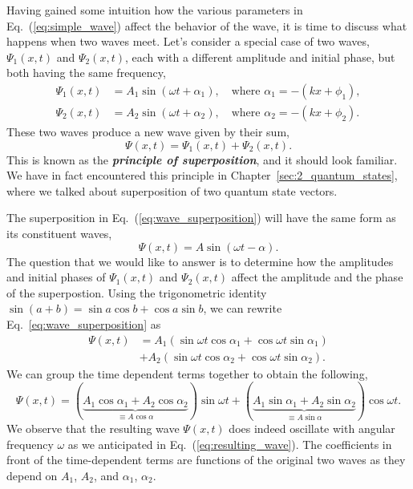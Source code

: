 Having gained some intuition how the various parameters in Eq.~(\ref{eq:simple_wave}) affect the behavior of the wave, it is time to discuss what happens when two waves meet.
Let's consider a special case of two waves, $\Psi_1(x,t)$ and $\Psi_2(x,t)$, each with a different amplitude and initial phase, but both having the same frequency,
\begin{align}
    \Psi_1(x,t) & = A_1 \sin \left(\omega t+\alpha_1\right), \quad\text{where } \alpha_1=-\left(k x+\phi_1\right), \\
    \Psi_2(x,t) & = A_2 \sin \left(\omega t+\alpha_2\right), \quad\text{where } \alpha_2=-\left(k x+\phi_2\right).
    \label{eq:superposition}
\end{align}
These two waves produce a new wave given by their sum,
\begin{equation}
    \Psi(x,t) = \Psi_1(x,t) + \Psi_2(x,t).
    \label{eq:wave_superposition}
\end{equation}
This is known as the \textbf{\emph{principle of superposition}},
and it should look familiar.
We have in fact encountered this principle in Chapter~\ref{sec:2_quantum_states}, where we talked about superposition of two quantum state vectors.

The superposition in Eq.~(\ref{eq:wave_superposition}) will have the same form as its constituent waves,
\begin{equation}
    \Psi(x,t) = A \sin (\omega t-\alpha).
    \label{eq:resulting_wave}
\end{equation}
The question that we would like to answer is to determine how the amplitudes and initial phases of $\Psi_1(x,t)$ and $\Psi_2(x,t)$ affect the amplitude and the phase of the superpostion.
Using the trigonometric identity $\sin (a + b)=\sin a \cos b +\cos a \sin b$, we can rewrite Eq.~\ref{eq:wave_superposition} as
\begin{align}
    \Psi(x,t) & = A_1 \left( \sin\omega t \cos\alpha_1 + \cos\omega t \sin \alpha_1 \right) \nonumber\\
    & + A_2 \left( \sin\omega t \cos\alpha_2 + \cos\omega t \sin\alpha_2 \right).
\end{align}
We can group the time dependent terms together to obtain the following, 
\begin{equation}
    \Psi(x,t) = ( \underbrace{A_1 \cos\alpha_1 + A_2 \cos\alpha_2}_{\equiv A\cos\alpha} ) \sin \omega t + ( \underbrace{A_1 \sin\alpha_1 + A_2 \sin\alpha_2}_{\equiv A\sin\alpha} ) \cos \omega t.
    \label{eq:resulting_wave_2}
\end{equation}
We observe that the resulting wave $\Psi(x,t)$ does indeed oscillate with angular frequency $\omega$ as we anticipated in Eq.~(\ref{eq:resulting_wave}).
The coefficients in front of the time-dependent terms are functions of the original two waves as they depend on $A_1$, $A_2$, and $\alpha_1$, $\alpha_2$.

